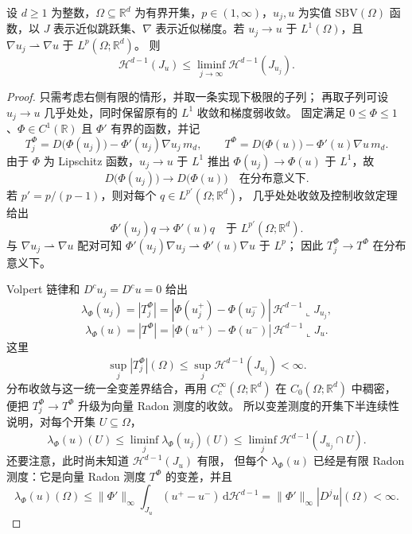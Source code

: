 \begin{proposition}\label{b1:prop:sbv-jump-area-lower-semicontinuity}
设 \(d\ge1\) 为整数，\(\Omega\subseteq\mathbb R^d\) 为有界开集，\(p\in(1,\infty)\)，\(u_j,u\) 为实值 \(\mathrm{SBV}(\Omega)\) 函数，以 \(J\) 表示近似跳跃集、\(\nabla\) 表示近似梯度。若
\(u_j\to u\) 于 \(L^1(\Omega)\)，且
\(\nabla u_j\rightharpoonup\nabla u\) 于 \(L^p(\Omega;\mathbb R^d)\)。
则
\[
 \mathcal H^{d-1}(J_u)
 \le\liminf_{j\to\infty}\mathcal H^{d-1}(J_{u_j}).
\]
\end{proposition}
\begin{proof}
只需考虑右侧有限的情形，并取一条实现下极限的子列；
再取子列可设 \(u_j\to u\) 几乎处处，同时保留原有的 \(L^1\) 收敛和梯度弱收敛。
固定满足 \(0\le\Phi\le1\)、\(\Phi\in C^1(\mathbb R)\) 且 \(\Phi'\) 有界的函数，并记
\[
 T_j^\Phi
 =D\bigl(\Phi(u_j)\bigr)-\Phi'(u_j)\nabla u_j\,m_d,\qquad
 T^\Phi
 =D\bigl(\Phi(u)\bigr)-\Phi'(u)\nabla u\,m_d.
\]
由于 \(\Phi\) 为 Lipschitz 函数，\(u_j\to u\) 于 \(L^1\) 推出
\(\Phi(u_j)\to\Phi(u)\) 于 \(L^1\)，故
\[
 D\bigl(\Phi(u_j)\bigr)\longrightarrow D\bigl(\Phi(u)\bigr)
 \quad\text{在分布意义下}.
\]
若 \(p'=p/(p-1)\)，则对每个 \(q\in L^{p'}(\Omega;\mathbb R^d)\)，
几乎处处收敛及控制收敛定理给出
\[
 \Phi'(u_j)q\longrightarrow\Phi'(u)q
 \quad\text{于 }L^{p'}(\Omega;\mathbb R^d).
\]
与 \(\nabla u_j\rightharpoonup\nabla u\) 配对可知
\(\Phi'(u_j)\nabla u_j\rightharpoonup\Phi'(u)\nabla u\) 于 \(L^p\)；
因此 \(T_j^\Phi\to T^\Phi\) 在分布意义下。

Volpert 链律和 \(D^cu_j=D^cu=0\) 给出
\[
 \lambda_\Phi(u_j)=|T_j^\Phi|
 =|\Phi(u_j^+)-\Phi(u_j^-)|\,
       \mathcal H^{d-1}\mathbin{\llcorner}J_{u_j},
\]
\[
 \lambda_\Phi(u)=|T^\Phi|
 =|\Phi(u^+)-\Phi(u^-)|\,
       \mathcal H^{d-1}\mathbin{\llcorner}J_u.
\]
这里
\[
 \sup_j|T_j^\Phi|(\Omega)
 \le\sup_j\mathcal H^{d-1}(J_{u_j})<\infty.
\]
分布收敛与这一统一全变差界结合，再用
\(C_c^\infty(\Omega;\mathbb R^d)\) 在 \(C_0(\Omega;\mathbb R^d)\) 中稠密，
便把 \(T_j^\Phi\to T^\Phi\) 升级为向量 Radon 测度的\WeakStar{}收敛。
所以变差测度的开集下半连续性说明，对每个开集 \(U\subseteq\Omega\)，
\[
 \lambda_\Phi(u)(U)\le
 \liminf_j\lambda_\Phi(u_j)(U)
 \le\liminf_j\mathcal H^{d-1}(J_{u_j}\cap U).
\]
还要注意，此时尚未知道 \(\mathcal H^{d-1}(J_u)\) 有限，
但每个 \(\lambda_\Phi(u)\) 已经是有限 Radon 测度：它是向量 Radon 测度
\(T^\Phi\) 的变差，并且
\[
 \lambda_\Phi(u)(\Omega)
 \le\|\Phi'\|_\infty
     \int_{J_u}(u^+-u^-)\,\mathrm d\mathcal H^{d-1}
 =\|\Phi'\|_\infty |D^ju|(\Omega)<\infty.
\]


\end{proof}
